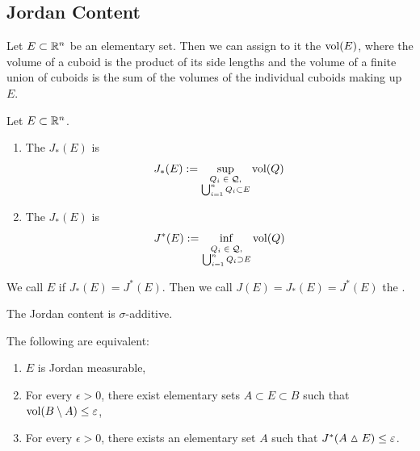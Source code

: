 \subsection{Jordan Content}
\begin{definition}
	Let $E \subset \mathbb{R}^n$ be an elementary set. Then we can assign to it the  $\operatorname{vol}(E)$, where the volume of a cuboid is the product of its side lengths and the volume of a finite union of cuboids is the sum of the volumes of the individual cuboids making up $E$.
\end{definition}
\begin{definition}
	Let $E \subset \mathbb{R}^n$.
	\begin{enumerate}
		\item  The  $J_*(E)$ is
		\begin{align*}
			J_*(E) := \sup_{\substack{\textnormal{$Q_i \in \mathcal{Q}$},\\ \bigcup_{i = 1}^n Q_i \subset E}} \operatorname{vol}(Q)
		\end{align*}
		\item The  $J_*(E)$ is 
		\begin{align*}
			J^*(E) := \inf_{\substack{\textnormal{$Q_i \in \cQ$},\\ \bigcup_{i = 1}^n Q_i \supset E}} \vol(Q)
		\end{align*}
	\end{enumerate}
\end{definition}
\begin{definition}
	We call $E$  if $J_*(E) = J^*(E)$. Then we call $J(E) = J_*(E) = J^*(E)$ the .
\end{definition}
\begin{theorem}
	The Jordan content is $\sigma$-additive.
\end{theorem}
\begin{theorem}
	The following are equivalent:
	\begin{enumerate}
		\item $E$ is Jordan measurable,
		\item For every $\epsilon > 0$, there exist elementary sets $A \subset E \subset B$ such that $\operatorname{vol}(B \setminus A) \leq \varepsilon$,
		\item For every $\epsilon > 0$, there exists an elementary set $A$ such that
		$J^*(A \vartriangle E) \leq \varepsilon$.
	\end{enumerate}
\end{theorem}

